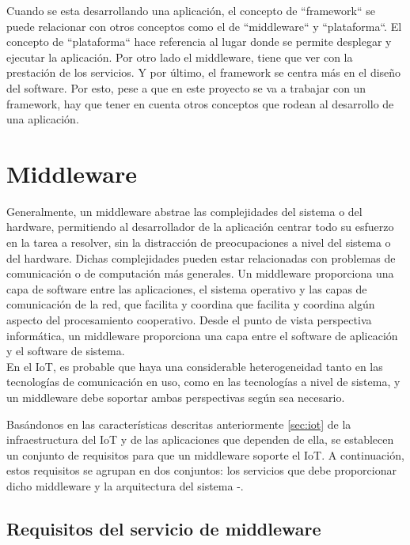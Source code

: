 {\newpage

Cuando se esta desarrollando una aplicación, el concepto de ``framework`` se puede relacionar con otros conceptos como el de ``middleware`` y ``plataforma``. El concepto de ``plataforma`` hace referencia al lugar donde se permite desplegar y ejecutar la aplicación. Por otro lado el middleware, tiene que ver con la prestación de los servicios. Y por último, el framework se centra más en el diseño del software. Por esto, pese a que en este proyecto se va a trabajar con un framework, hay que tener en cuenta otros conceptos que rodean al desarrollo de una aplicación. \cite{nakhuva2015study}

\section{Middleware} \label{sec:middleware}

Generalmente, un middleware abstrae las complejidades del sistema o del hardware, permitiendo al desarrollador de la aplicación centrar todo su esfuerzo en la tarea a resolver, sin la distracción de preocupaciones a nivel del sistema o del hardware. Dichas complejidades pueden estar relacionadas con problemas de comunicación o de computación más generales. Un middleware proporciona una capa de software entre las aplicaciones, el sistema operativo y las capas de comunicación de la red, que facilita y coordina que facilita y coordina algún aspecto del procesamiento cooperativo. Desde el punto de vista perspectiva informática, un middleware proporciona una capa entre el software de aplicación y el software de sistema.\\

En el IoT, es probable que haya una considerable heterogeneidad tanto en las tecnologías de comunicación en uso, como en las tecnologías a nivel de sistema, y un middleware debe soportar ambas perspectivas según sea necesario. 

Basándonos en las características descritas anteriormente \ref{sec:iot} de la infraestructura del IoT y de las aplicaciones que dependen de ella, se establecen un conjunto de requisitos para que un middleware soporte el IoT. A continuación, estos requisitos se agrupan en dos conjuntos: los servicios que debe proporcionar dicho middleware y la arquitectura del sistema \cite{7322178}-\cite{7582463}.

\subsection{Requisitos del servicio de middleware}

}
